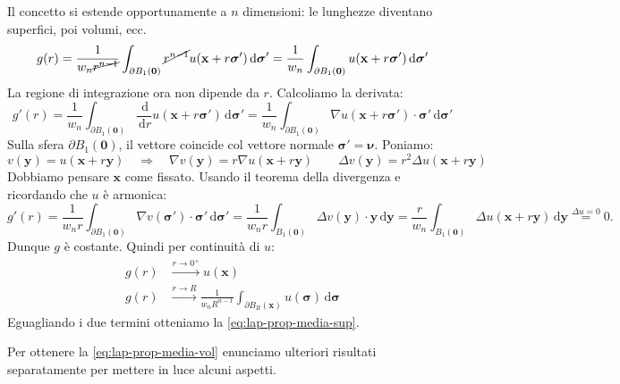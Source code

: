 \documentclass[10pt,a4paper,twoside,openright]{book}
\newcommand{\x}{\mathbf{x}}
\newcommand{\y}{\mathbf{y}}
\newcommand{\zer}{\mathbf{0}}
\newcommand{\sigg}{\bm{\sigma}}
\newcommand{\nuu}{\bm{\nu}}
\newcommand{\de}{\,\mathrm d}
\newcommand{\dr}{\de r}
\newcommand{\dyy}{\de \y}
\newcommand{\dsig}{\de \sigg}
\begin{document}
\begin{dimostrazione}
    Il concetto si estende opportunamente a $n$ dimensioni: le lunghezze diventano superfici, poi volumi, ecc.
    \begin{equation*}
        g(r) =\frac{1}{w_{n}\cancel{r^{n-1}}}\int _{\partial B_{1}(\zer)}\cancel{r^{n-1}} u(\x +r\sigg ') \dsig '=\frac{1}{w_{n}}\int _{\partial B_{1}(\zer)} u(\x +r\sigg ') \dsig '
    \end{equation*}
    La regione di integrazione ora non dipende da $r$. Calcoliamo la derivata:
    \begin{equation*}
        g'(r) =\frac{1}{w_{n}}\int _{\partial B_{1}(\zer)}\frac{\de}{\dr} u(\x +r\sigg ') \dsig '=\frac{1}{w_{n}}\int _{\partial B_{1}(\zer)} \nabla u(\x +r\sigg ') \cdotp \sigg '\dsig '
    \end{equation*}
    Sulla sfera $\displaystyle \partial B_{1}(\zer)$, il vettore coincide col vettore normale $\displaystyle \sigg '=\nuu$.
    Poniamo:
    \begin{equation*}
        v(\y)=u(\x+r\y) \quad \Rightarrow \quad \nabla v(\y)=r\nabla u(\x+r\y)\qquad \Delta v(\y)=r^2 \Delta u(\x+r\y)
    \end{equation*}
    Dobbiamo pensare $\x$ come fissato. Usando il teorema della divergenza e ricordando che $u$ è armonica:
    \begin{equation*}
        g'(r) =\frac{1}{w_{n}r}\int _{\partial B_{1}(\zer)} \nabla  v(\sigg') \cdot \sigg' \dsig' =\frac{1}{w_{n}r}\int _{B_{1}(\zer)} \Delta   v(\y) \cdot \y \dyy   =\frac{r}{w_{n}}\int _{B_{1}(\zer)} \Delta u(\x +r\y) \dyy\overset{\Delta u=0}{=} 0.
    \end{equation*}
    Dunque $g$ è costante. Quindi per continuità di $u$:
    \begin{align*}
        g(r) & \xrightarrow{r\rightarrow 0^{+}} u(\x)                                                       \\
        g(r) & \xrightarrow{r\rightarrow R}\frac{1}{w_{n} R^{n-1}}\int _{\partial B_{R}(\x)} u(\sigg) \dsig
    \end{align*}
    Eguagliando i due termini otteniamo la \eqref{eq:lap-prop-media-sup}.

    Per ottenere la \eqref{eq:lap-prop-media-vol} enunciamo ulteriori risultati separatamente per mettere in luce alcuni aspetti.
\end{dimostrazione}
\end{document}
